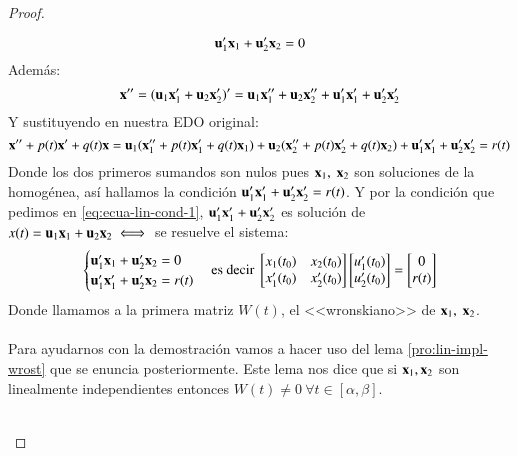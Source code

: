 \begin{proof}
\begin{enumerate}
    \begin{equation}\label{eq:ecua-lin-cond-1}
        \mathbf{u}_1' \mathbf{x}_1 + \mathbf{u}_2' \mathbf{x}_2 = 0
    \end{equation}
    Además:
    $$
        \mathbf{x}'' = (\mathbf{u}_1 \mathbf{x}_1' + \mathbf{u}_2 \mathbf{x}_2')' = \mathbf{u}_1 \mathbf{x}_1'' + \mathbf{u}_2 \mathbf{x}_2'' + \mathbf{u}_1' \mathbf{x}_1' + \mathbf{u}_2' \mathbf{x}_2'
    $$
    Y sustituyendo en nuestra EDO original:
    $$
        \mathbf{x}'' + p(t) \mathbf{x}' + q(t) \mathbf{x} = \mathbf{u}_1 ( \mathbf{x}_1'' + p(t) \mathbf{x}_1' + q(t) \mathbf{x}_1) + \mathbf{u}_2 ( \mathbf{x}_2'' + p(t) \mathbf{x}_2' + q(t) \mathbf{x}_2)  + \mathbf{u}_1' \mathbf{x}_1' + \mathbf{u}_2' \mathbf{x}_2' = r(t)
    $$
    Donde los dos primeros sumandos son nulos pues $\mbf{x}_1,\ \mbf{x}_2$ son soluciones de la homogénea, así hallamos la condición $\mathbf{u}_1' \mathbf{x}_1' + \mathbf{u}_2' \mathbf{x}_2' = r(t)$. Y por la condición que pedimos en \ref{eq:ecua-lin-cond-1}, $\mathbf{u}_1' \mathbf{x}_1' + \mathbf{u}_2' \mathbf{x}_2'$ es solución de $x(t) = \mathbf{u}_1 \mathbf{x}_1 + \mathbf{u}_2 \mathbf{x}_2 \iff$ se resuelve el sistema:
    $$
        \begin{cases}
            \mathbf{u}_1' \mathbf{x}_1 + \mathbf{u}_2' \mathbf{x}_2 = 0\\
            \mathbf{u}_1' \mathbf{x}_1' + \mathbf{u}_2' \mathbf{x}_2 = r(t)
        \end{cases} \text{es decir }
        \left[
        \begin{matrix}
            x_1(t_0) & x_2(t_0)\\
            x_1'(t_0) & x_2'(t_0)
        \end{matrix}
        \right]
        \left[
        \begin{matrix}
            u_1'(t_0)\\
            u_2'(t_0)
        \end{matrix}
        \right] =
        \left[
        \begin{matrix}
            0\\
            r(t)
        \end{matrix}
        \right]
    $$
    Donde llamamos a la primera matriz $W(t)$, el <<wronskiano>> de $\mbf{x}_1,\ \mbf{x}_2$.\\\\
    Para ayudarnos con la demostración vamos a hacer uso del lema \ref{pro:lin-impl-wrost} que se enuncia posteriormente. Este lema nos dice que si $\mathbf{x}_1, \mathbf{x}_2$ son linealmente independientes entonces $W(t) \neq 0\ \forall t\in[\alpha, \beta]$.\\\\

\end{enumerate}
\end{proof}
